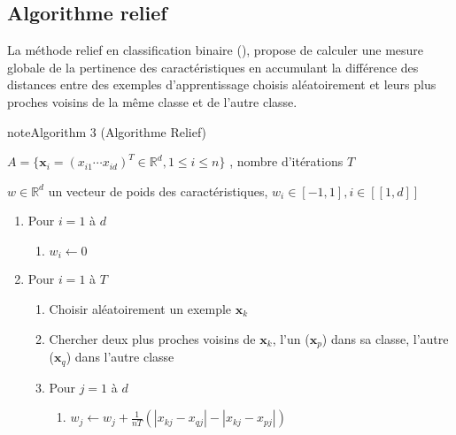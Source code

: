 \documentclass[letterpaper,10pt,french]{sphinxmanual}
\begin{document}
\subsection{Algorithme relief}
\label{\detokenize{selection:algorithme-relief}}
\sphinxAtStartPar
La méthode relief en classification binaire ({\hyperref[\detokenize{selection:relief}]{}}), propose de calculer une mesure globale de la pertinence des caractéristiques en accumulant la différence des distances entre des exemples d’apprentissage choisis aléatoirement et leurs plus proches voisins de la même classe et de l’autre classe.
\label{selection:relief}
\begin{sphinxadmonition}{note}{Algorithm 3 (Algorithme Relief)}



\sphinxAtStartPar
{} \(A= \{\mathbf x_i=\left (x_{i1} \cdots x_{id} \right )^T\in\mathbb{R}^d,1\leq i\leq n  \}\) , nombre d’itérations \(T\)

\sphinxAtStartPar
{} \(w\in\mathbb{R}^d\) un vecteur de poids des caractéristiques, \(w_i\in[-1,1],i\in[\![1,d]\!]\)
\begin{enumerate}
%
\item {} 
\sphinxAtStartPar
Pour \(i=1\) à \( d\)
\begin{enumerate}
%
\item {} 
\sphinxAtStartPar
\(w_i\leftarrow 0\)

\end{enumerate}

\item {} 
\sphinxAtStartPar
Pour \(i=1\) à \( T\)
\begin{enumerate}
%
\item {} 
\sphinxAtStartPar
Choisir aléatoirement un exemple \(\mathbf x_k\)

\item {} 
\sphinxAtStartPar
Chercher deux plus proches voisins de \(\mathbf x_k\), l’un (\(\mathbf x_p\)) dans sa  classe, l’autre (\(\mathbf x_q\)) dans l’autre classe

\item {} 
\sphinxAtStartPar
Pour \(j=1\) à \(d\)
\begin{enumerate}
%
\item {} 
\sphinxAtStartPar
\(w_j\leftarrow w_j+\frac{1}{nT}\left (|x_{kj} -x_{qj}|-|x_{kj} -x_{pj}| \right )\)

\end{enumerate}

\end{enumerate}

\end{enumerate}
\end{sphinxadmonition}
\end{document}

